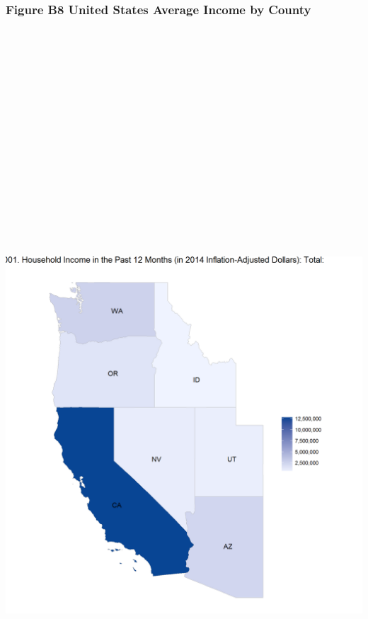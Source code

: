 \documentclass[]{article}
\begin{document}
\newpage

\subsubsection{Figure B8 United States Average Income by
County}\label{figure-b8-united-states-average-income-by-county}

\section{\texorpdfstring{\protect\includegraphics[height=12.50000in]{images/county_income_wczoom.png}}{US Average Income by County}}\label{us-average-income-by-county-1}
\end{document}
